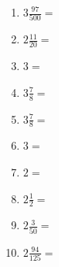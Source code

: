 \documentclass[12pt]{article}
\begin{document}
\begin{enumerate}
\newpage
\item \large $ 3 \frac{97}{500} = $ \vspace{1.5cm}
\item \large $ 2 \frac{11}{20} = $ \vspace{1.5cm}
\item \large $ 3 = $ \vspace{1.5cm}
\item \large $ 3 \frac{7}{8} = $ \vspace{1.5cm}
\item \large $ 3 \frac{7}{8} = $ \vspace{1.5cm}
\item \large $ 3 = $ \vspace{1.5cm}
\item \large $ 2 = $ \vspace{1.5cm}
\item \large $ 2 \frac{1}{2} = $ \vspace{1.5cm}
\item \large $ 2 \frac{3}{50} = $ \vspace{1.5cm}
\item \large $ 2 \frac{94}{125} = $ \vspace{1.5cm}
\end{enumerate}\newpage
\end{document}
